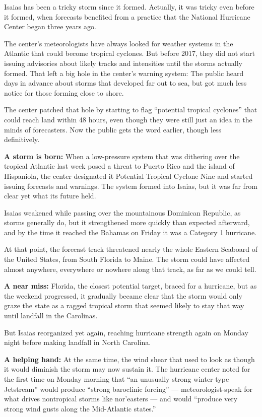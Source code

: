 Isaias has been a tricky storm since it formed. Actually, it was tricky
even before it formed, when forecasts benefited from a practice that the
National Hurricane Center began three years ago.

The center's meteorologists have always looked for weather systems in
the Atlantic that could become tropical cyclones. But before 2017, they
did not start issuing advisories about likely tracks and intensities
until the storms actually formed. That left a big hole in the center's
warning system: The public heard days in advance about storms that
developed far out to sea, but got much less notice for those forming
close to shore.

The center patched that hole by starting to flag ``potential tropical
cyclones'' that could reach land within 48 hours, even though they were
still just an idea in the minds of forecasters. Now the public gets the
word earlier, though less definitively.

\textbf{A storm is born:} When a low-pressure system that was dithering
over the tropical Atlantic last week posed a threat to Puerto Rico and
the island of Hispaniola, the center designated it Potential Tropical
Cyclone Nine and started issuing forecasts and warnings. The system
formed into Isaias, but it was far from clear yet what its future held.

Isaias weakened while passing over the mountainous Dominican Republic,
as storms generally do, but it strengthened more quickly than expected
afterward, and by the time it reached the Bahamas on Friday it was a
Category 1 hurricane.

At that point, the forecast track threatened nearly the whole Eastern
Seaboard of the United States, from South Florida to Maine. The storm
could have affected almost anywhere, everywhere or nowhere along that
track, as far as we could tell.

\textbf{A near miss:} Florida, the closest potential target, braced for
a hurricane, but as the weekend progressed, it gradually became clear
that the storm would only graze the state as a ragged tropical storm
that seemed likely to stay that way until landfall in the Carolinas.

But Isaias reorganized yet again, reaching hurricane strength again on
Monday night before making landfall in North Carolina.

\textbf{A helping hand:} At the same time, the wind shear that used to
look as though it would diminish the storm may now sustain it. The
hurricane center noted for the first time on Monday morning that ``an
unusually strong winter-type Jetstream'' would produce ``strong
baroclinic forcing'' --- meteorologist-speak for what drives nontropical
storms like nor'easters --- and would ``produce very strong wind gusts
along the Mid-Atlantic states.''

